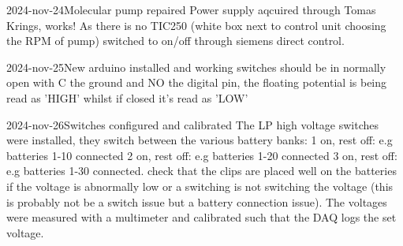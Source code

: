 \begin{logentry}{2024-nov-24}{Molecular pump repaired}
	Power supply aqcuired through Tomas Krings, works!
	As there is no TIC250 (white box next to control unit
	choosing the RPM of pump) switched to on/off through 
	siemens direct control.
\end{logentry}
\begin{logentry}{2024-nov-25}{New arduino installed and working}
	switches should be in normally open with C the ground and NO
	the digital pin, the floating potential
	is being read as 'HIGH' whilst if closed it's read as 'LOW'
\end{logentry}
\begin{logentry}{2024-nov-26}{Switches configured and calibrated}
	The LP high voltage switches were installed,
	they switch between the various battery banks:
	1 on, rest off: e.g batteries 1-10 connected
	2 on, rest off: e.g batteries 1-20 connected
	3 on, rest off: e.g batteries 1-30 connected.
	check that the clips are placed well on the batteries
	if the voltage is abnormally low or a switching is not switching
	the voltage (this is probably not be a switch issue but a battery
	connection issue).
	The voltages were measured with a multimeter and calibrated such
	that the DAQ logs the set voltage.
\end{logentry}
